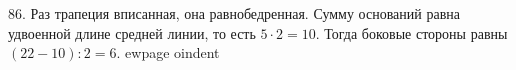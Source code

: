 86. Раз трапеция вписанная, она равнобедренная. Сумму оснований равна удвоенной длине средней линии, то есть $5\cdot2=10.$ Тогда боковые стороны равны $(22-10):2=6.$
ewpage
oindent
